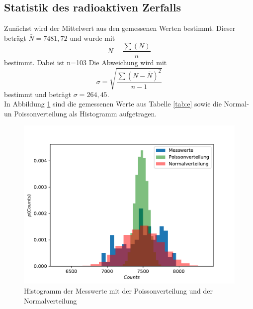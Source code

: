 \subsection{Statistik des radioaktiven Zerfalls}
Zunächst wird der Mittelwert aus den gemessenen Werten bestimmt.
Dieser beträgt $\bar{N}= 7481,72$ und wurde mit
\begin{equation*}
  \bar{N}= \frac{\sum (N)}{n}
\end{equation*}
bestimmt.
Dabei ist n=103
Die Abweichung wird mit
\begin{equation*}
  \sigma = \sqrt{\frac{\sum(N-\bar{N})^2}{n-1}}
\end{equation*}
bestimmt und beträgt $\sigma = 264,45$.\\
In Abbildung \ref{fig:statistik} sind die gemessenen Werte aus Tabelle \ref{tab:e}
sowie die Normal- un Poissonverteilung als Histogramm aufgetragen.
\begin{figure}[H]
\centering
\includegraphics[width=\textwidth]{Statistik.pdf}
\caption{Histogramm der Messwerte mit der Poissonverteilung und der Normalverteilung}
\label{fig:statistik}
\end{figure}

